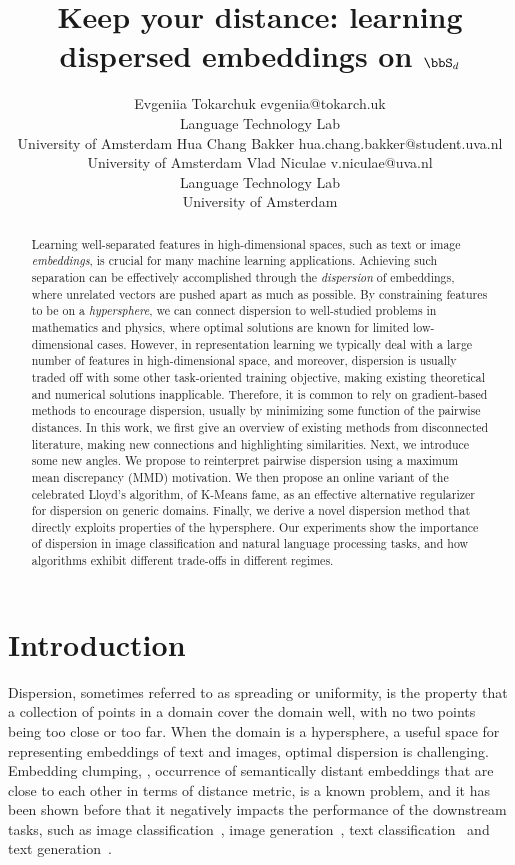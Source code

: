\documentclass[10pt]{article} %
\title{Keep your distance: learning dispersed embeddings 
on \(\bbS_d\)}
\author{\name Evgeniia Tokarchuk \email evgeniia@tokarch.uk \\
      \addr Language Technology Lab\\
      University of Amsterdam
      \AND
      \name Hua Chang Bakker \email hua.chang.bakker@student.uva.nl\\
      \addr University of Amsterdam
      \AND
      \name Vlad Niculae \email v.niculae@uva.nl\\
      \addr Language Technology Lab \\
      University of Amsterdam\\
     }
\begin{document}
\maketitle

\begin{abstract}
Learning well-separated features in high-dimensional spaces, such as text or image \textit{embeddings}, is crucial for many machine learning applications. Achieving such separation can be effectively accomplished through the \textit{dispersion} of embeddings, where unrelated vectors are pushed apart as much as possible. By constraining features to be on a \textit{hypersphere}, we can connect dispersion to well-studied problems in mathematics and physics, where optimal solutions are known for limited low-dimensional cases. However, in representation learning we typically deal with a large number of features in high-dimensional space, and moreover, dispersion is usually traded off with some other task-oriented training objective, making existing theoretical and numerical solutions inapplicable. 
Therefore, it is common to rely on gradient-based methods to 
encourage dispersion, usually by minimizing some function of the pairwise distances. 
In this work, we first give an overview of existing methods from disconnected literature, 
making new connections and highlighting similarities.
Next, we introduce some new angles. We propose to reinterpret pairwise dispersion using a maximum mean discrepancy (MMD)
motivation. We then propose an online variant of the celebrated Lloyd’s algorithm, of K-Means fame, as an effective alternative regularizer for dispersion on generic domains. Finally, we derive a novel dispersion method that directly exploits properties of the hypersphere. Our experiments show the importance of dispersion in image classification and natural language processing tasks, and how algorithms exhibit different trade-offs in different regimes.

\end{abstract}

\section{Introduction}
Dispersion, sometimes referred to as spreading or uniformity,
is the property that a collection of points in a domain cover the domain well, with no two points being too close or too far.
When the domain is a hypersphere, a useful space for representing embeddings of text and images, optimal dispersion is challenging. 
Embedding clumping, \ie, occurrence of semantically distant embeddings that are close to each other in terms of distance metric, is a known problem, and it has been shown before that it negatively impacts the performance of the downstream tasks, such as image classification~\citep{pmlr-v119-wang20k,pmlr-v130-liu21d,Trosten-noHub-2023}, image generation~\citep{pmlr-v130-liu21d}, text classification~\citep{pmlr-v119-wang20k} and text generation~\citep{tokarchuk-niculae-2024-unreasonable}. 
\end{document}
